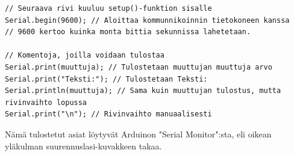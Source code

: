 



\begin{tcolorbox}[colback=white,title=Vinkkejä Arduinolla koodaamiseen!,colbacktitle=purple!90]
\begin{lstlisting}
// Seuraava rivi kuuluu setup()-funktion sisalle
Serial.begin(9600); // Aloittaa kommunnikoinnin tietokoneen kanssa
// 9600 kertoo kuinka monta bittia sekunnissa lahetetaan.

// Komentoja, joilla voidaan tulostaa
Serial.print(muuttuja); // Tulostetaan muuttujan muuttuja arvo
Serial.print("Teksti:"); // Tulostetaan Teksti: 
Serial.println(muuttuja); // Sama kuin muuttujan tulostus, mutta rivinvaihto lopussa
Serial.print("\n"); // Rivinvaihto manuaalisesti
\end{lstlisting}
\end{tcolorbox}

Nämä tulostetut asiat löytyvät Arduinon "Serial Monitor":sta, eli oikean yläkulman suurennuslasi-kuvakkeen takaa.

